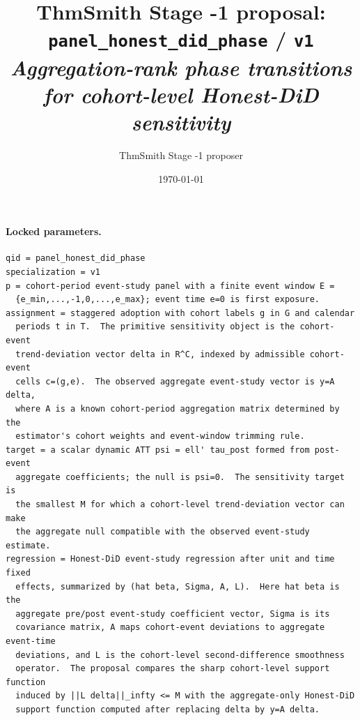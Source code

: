 \documentclass[11pt]{article}
\title{ThmSmith Stage -1 proposal: \texttt{panel\_honest\_did\_phase} / \texttt{v1}%
  \\ \large\textit{Aggregation-rank phase transitions for cohort-level Honest-DiD sensitivity}}
\author{ThmSmith Stage -1 proposer}
\date{\today}
\theoremstyle{definition}
\theoremstyle{plain}
\theoremstyle{remark}
\begin{document}
\maketitle


\paragraph{Locked parameters.}
\begin{verbatim}
qid = panel_honest_did_phase
specialization = v1
p = cohort-period event-study panel with a finite event window E =
  {e_min,...,-1,0,...,e_max}; event time e=0 is first exposure.
assignment = staggered adoption with cohort labels g in G and calendar
  periods t in T.  The primitive sensitivity object is the cohort-event
  trend-deviation vector delta in R^C, indexed by admissible cohort-event
  cells c=(g,e).  The observed aggregate event-study vector is y=A delta,
  where A is a known cohort-period aggregation matrix determined by the
  estimator's cohort weights and event-window trimming rule.
target = a scalar dynamic ATT psi = ell' tau_post formed from post-event
  aggregate coefficients; the null is psi=0.  The sensitivity target is
  the smallest M for which a cohort-level trend-deviation vector can make
  the aggregate null compatible with the observed event-study estimate.
regression = Honest-DiD event-study regression after unit and time fixed
  effects, summarized by (hat beta, Sigma, A, L).  Here hat beta is the
  aggregate pre/post event-study coefficient vector, Sigma is its
  covariance matrix, A maps cohort-event deviations to aggregate event-time
  deviations, and L is the cohort-level second-difference smoothness
  operator.  The proposal compares the sharp cohort-level support function
  induced by ||L delta||_infty <= M with the aggregate-only Honest-DiD
  support function computed after replacing delta by y=A delta.
\end{verbatim}
\end{document}
